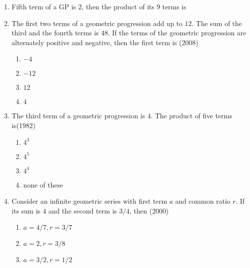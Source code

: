 \begin{enumerate}[label=\thesubsection.\arabic*,ref=\thesubsection.\theenumi]

\item {Fifth term of a GP is $2$, then the product of its $9$ terms is}
{\hfill{}}
\begin{enumerate}	
\end{enumerate}
    \item  The first two terms of a geometric progression add up to $12$. The sum of the third and the fourth terms is $48$. If the terms of the geometric progression are alternately positive and negative,  then the first term is   
    \hfill(2008)
%    
    \begin{multicols}{4}
\begin{enumerate}    
    \item$-4$
    \item$-12$
    \item$12$ 
    \item$4$ 
    \end{enumerate}
\end{multicols}
	\item  The third term of a geometric progression is $4$. The product of five terms is\hfill{(1982)}
\begin{multicols}{4}
\begin{enumerate}    
     \item${4^3}$ 
    \item${4^5}$
    \item${4^4}$
    \item none of these
\end{enumerate}
\end{multicols}
\item Consider an infinite geometric series with first term $a$ and common ratio $r$. If its sum is $4$ and the second term is $3/4$,  then \hfill (2000)
        \begin{multicols}{4}
\begin{enumerate}    
            \item $a=4/7, r=3/7$
            \item $a=2, r=3/8$
            \item $a=3/2, r=1/2$

\end{enumerate}
\end{multicols}
\end{enumerate}
